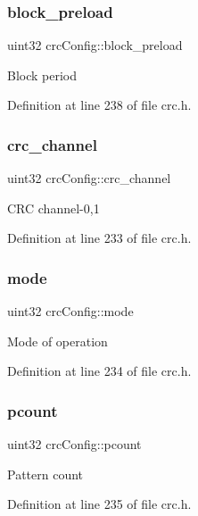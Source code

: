 \subsubsection{\texorpdfstring{block\+\_\+preload}{block\_preload}}
{\footnotesize\ttfamily uint32 crc\+Config\+::block\+\_\+preload}

Block period 

Definition at line 238 of file crc.\+h.

\mbox{\label{structcrcConfig_ab54bed0d40319fb79732059b240faad1}} 
\subsubsection{\texorpdfstring{crc\+\_\+channel}{crc\_channel}}
{\footnotesize\ttfamily uint32 crc\+Config\+::crc\+\_\+channel}

C\+RC channel-\/0,1 

Definition at line 233 of file crc.\+h.

\mbox{\label{structcrcConfig_ad3578b2d11eb0ffa1a0d4dd75e7e9465}} 
\subsubsection{\texorpdfstring{mode}{mode}}
{\footnotesize\ttfamily uint32 crc\+Config\+::mode}

Mode of operation 

Definition at line 234 of file crc.\+h.

\mbox{\label{structcrcConfig_a8c90bbdcf8ea8a062273e62ea40fce36}} 
\subsubsection{\texorpdfstring{pcount}{pcount}}
{\footnotesize\ttfamily uint32 crc\+Config\+::pcount}

Pattern count 

Definition at line 235 of file crc.\+h.

\mbox{\label{structcrcConfig_abfc8935e33601a14f96ab83618b93482}} 
